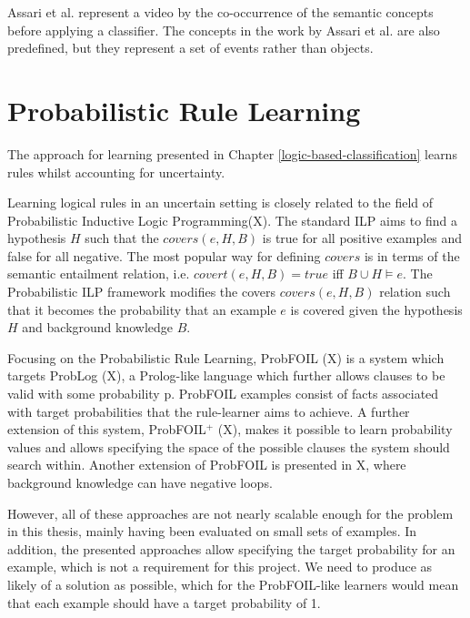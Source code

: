 Assari et al. \cite{RefWorks:RefID:52-assari2014video} represent a video by the co-occurrence of the semantic concepts before applying a classifier.
The concepts in the work by Assari et al. are also predefined, but they represent a set of events rather than objects.


\section{Probabilistic Rule Learning}
\label{probabilistic-rule-learning}

The approach for learning presented in Chapter \ref{logic-based-classification} learns rules whilst accounting for uncertainty.

Learning logical rules in an uncertain setting is closely related to the field of Probabilistic Inductive Logic Programming(X).
The standard ILP aims to find a hypothesis $H$ such that the $covers(e, H, B)$ is true for all positive examples and false for all negative.
The most popular way for defining $covers$ is in terms of the semantic entailment relation, i.e. $covert(e, H, B) = true$ iff $B \cup H \vDash e$.
The Probabilistic ILP framework modifies the covers $covers(e, H, B)$ relation such that it becomes the probability that an example $e$ is covered given the hypothesis $H$ and background knowledge $B$.

Focusing on the Probabilistic Rule Learning, ProbFOIL (X) is a system which targets ProbLog (X), a Prolog-like language which further allows clauses to be valid with some probability p.
ProbFOIL examples consist of facts associated with target probabilities that the rule-learner aims to achieve.
A further extension of this system, ProbFOIL$^+$ (X), makes it possible to learn probability values and allows specifying the space of the possible clauses the system should search within.
Another extension of ProbFOIL is presented in X, where background knowledge can have negative loops.

However, all of these approaches are not nearly scalable enough for the problem in this thesis, mainly having been evaluated on small sets of examples.
In addition, the presented approaches allow specifying the target probability for an example, which is not a requirement for this project.
We need to produce as likely of a solution as possible, which for the ProbFOIL-like learners would mean that each example should have a target probability of 1.

